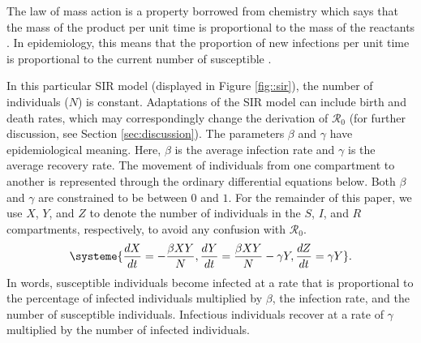 \documentclass[12pt]{article}
\newcommand{\rr}{\ensuremath{\mathcal{R}_0}}
\begin{document}
The law of mass action is a property borrowed from chemistry which says that the mass of the product per unit time is proportional to the mass of the reactants \citep{lotka1920}.  In epidemiology, this means that the proportion of new infections per unit time is proportional to the current  number of susceptible \citep{anderson1992}.  
 

In this particular  SIR model (displayed in Figure \ref{fig::sir}), the number of individuals ($N$) is constant. Adaptations of the SIR model can include birth and death rates, which may correspondingly change the derivation of $\rr$ (for further discussion, see Section \ref{sec:discussion}). The parameters  $\beta$ and $\gamma$ have epidemiological meaning.  Here, $\beta$ is the average infection rate and $\gamma$ is the average recovery rate.  The movement of individuals from one compartment to another is represented through the ordinary differential equations below.  Both $\beta$ and $\gamma$ are constrained to be between $0$ and $1$.  For the remainder of this paper, we use $X$, $Y$, and $Z$ to denote the number of individuals in the $S$, $I$, and $R$ compartments, respectively, to avoid any confusion with $\rr$.
\begin{align}
\systeme{\frac{dX}{dt} = -\frac{\beta XY}{N}, \frac{dY}{dt} = \frac{\beta XY}{N} - \gamma Y, \frac{dZ}{dt} = \gamma Y}. \label{eq:sir}
\end{align}
In words, susceptible individuals become infected at a rate that is proportional to the percentage of infected individuals multiplied by $\beta$, the infection rate, and the number of susceptible individuals.  Infectious individuals recover at a rate of $\gamma$ multiplied by the number of infected individuals.
\end{document}
